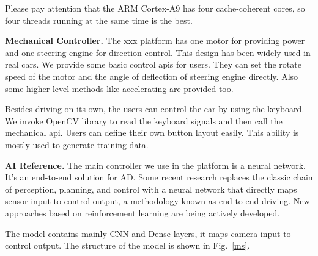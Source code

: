 \documentclass[conference]{IEEEtran}
\begin{document}
\begin{sloppypar}
Please pay attention that the ARM Cortex-A9 has four cache-coherent cores, so four threads running at the same time is the best. 

\textbf{Mechanical Controller.} The xxx platform has one motor for providing power and one steering engine for direction control. This design has been widely used in real cars. We provide some basic control apis for users. They can set the rotate speed of the motor and the angle of deflection of steering engine directly. Also some higher level methods like accelerating are provided too. 

Besides driving on its own, the users can control the car by using the keyboard. We invoke OpenCV\cite{b20} library to read the keyboard signals and then call the mechanical api. Users can define their own button layout easily. This ability is mostly used to generate training data.

\textbf{AI Reference.} The main controller we use in the platform is a neural network. It's an end-to-end solution for AD. Some recent research replaces the classic chain of perception, planning, and control with a neural network that directly maps sensor input to control output\cite{b21, b22, b23}, a methodology known as end-to-end driving. New approaches based on reinforcement learning are being actively developed\cite{b24}.

The model contains mainly CNN and Dense layers\cite{b25}, it maps camera input to control output. The structure of the model is shown in Fig.~\ref{ms}.


\end{sloppypar}
\end{document}
